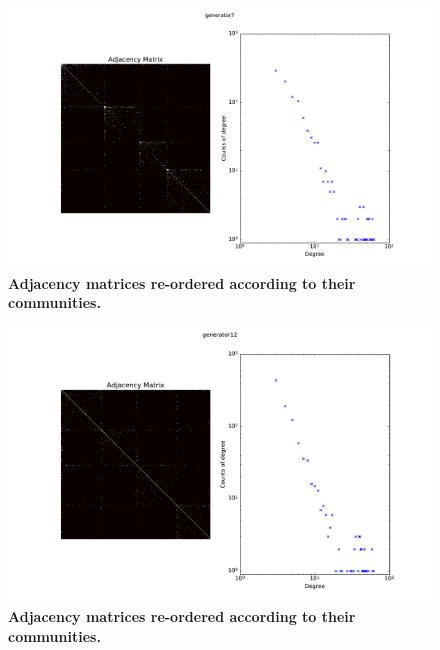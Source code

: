\begin{figure}[h]
	\centering
	\includegraphics[scale=0.25]{img/Graph7}
	\caption{\textbf{Adjacency matrices re-ordered according to their communities.}}
	\label{fig:}
\end{figure}
\begin{figure}[h]
	\centering
	\includegraphics[scale=0.25]{img/Graph12}
	\caption{\textbf{Adjacency matrices re-ordered according to their communities.}}
	\label{fig:}
\end{figure}
